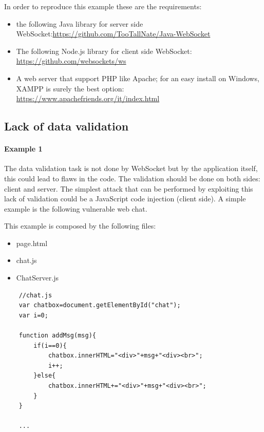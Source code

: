 	In order to reproduce this example these are the requirements:
	\begin{itemize}
		\item the following Java library for server side WebSocket:\url{https://github.com/TooTallNate/Java-WebSocket}
		\item The following Node.js library for client side WebSocket: \url{https://github.com/websockets/ws}
		\item A web server that support PHP like Apache; for an easy install on Windows, XAMPP is surely the best option: \url{https://www.apachefriends.org/it/index.html}
	\end{itemize}
	
	\subsection{Lack of data validation}
	
	\paragraph{Example 1} The data validation task is not done by WebSocket but by the application itself, this could lead to flaws in the code.\newline
	The validation should be done on both sides: client and server.\newline
	The simplest attack that can be performed by exploiting this lack of validation could be a JavaScript code injection (client side).\newline
	A simple example is the following vulnerable web chat.\newline
	
	This example is composed by the following files:
	\begin{itemize}
		\item page.html
		\item chat.js
		\item ChatServer.js
	\end{itemize}

	\begin{lstlisting}
	//chat.js
	var chatbox=document.getElementById("chat");
	var i=0;
	
	function addMsg(msg){
		if(i==0){
			chatbox.innerHTML="<div>"+msg+"<div><br>";
			i++;
		}else{
			chatbox.innerHTML+="<div>"+msg+"<div><br>";
		}
	}
	
	...
	
	\end{lstlisting}
	
